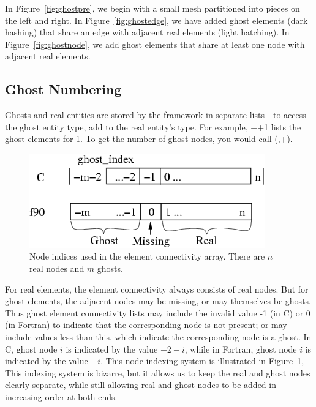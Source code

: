 In Figure~\ref{fig:ghostpre}, we begin with a small mesh partitioned
into pieces on the left and right.  In Figure~\ref{fig:ghostedge},
we have added ghost elements (dark hashing) that share an edge with
adjacent real elements (light hatching).  In Figure~\ref{fig:ghostnode},
we add ghost elements that share at least one node with adjacent 
real elements.



\subsection{Ghost Numbering}
\label{sec:ghostnum}
Ghosts and real entities are stored by the framework
in separate lists---to access the ghost entity type, add 
to the real entity's type.  For example, ++1 
lists the ghost elements for  1.  To get the number 
of ghost nodes, you would call 
(,+).

\begin{figure}[h]
\begin{center}
\includegraphics[width=4in]{fig/conn_indexing}
\end{center}
\caption{Node indices used in the element connectivity array.
There are $n$ real nodes and $m$ ghosts.}
\label{fig:connindexing}
\end{figure}

For real elements, the element connectivity always consists of real nodes.
But for ghost elements, the adjacent nodes may be missing, or may themselves
be ghosts.
Thus ghost element connectivity lists may include the invalid 
value -1 (in C) or 0 (in Fortran) to indicate that the corresponding 
node is not present; or may include values
less than this, which indicate the corresponding node is a ghost.
In C, ghost node $i$ is indicated by the value $-2-i$, while
in Fortran, ghost node $i$ is indicated by the value $-i$.  
This node indexing system is illustrated in Figure~\ref{fig:connindexing}, 
This indexing system is bizarre, but it allows us to keep
the real and ghost nodes clearly separate, while still
allowing real and ghost nodes to be added in increasing order
at both ends.

